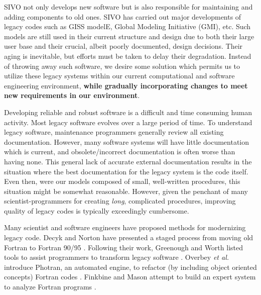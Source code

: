 \documentclass[11pt]{article}
\begin{document}
\noindent
SIVO not only develops new software but is also responsible for
maintaining and adding components to old ones. SIVO has carried out
major developments of legacy codes such as GISS
modelE\cite{Schmidt-eal06}, Global Modeling Initiative (GMI), etc.
Such models are still used in their current structure and design due
to both their large user base and their crucial, albeit poorly
documented, design decisions.  Their aging is inevitable, but efforts
must be taken to delay their degradation\cite{Parnas94}.  Instead of
throwing away such software, we desire some solution which permits us
to utilize these legacy systems within our current computational
and software engineering environment, {\bf while gradually incorporating
changes to meet new requirements in our environment}.

Developing reliable and robust software is a difficult and time
consuming human activity. Most legacy software evolves over a large
period of time.  To understand legacy software, maintenance
programmers generally review all existing documentation. However, many
software systems will have little documentation which is current, and
obsolete/incorrect documentation is often worse than having none. This
general lack of accurate external documentation results in the
situation where the best documentation for the legacy system is the
code itself\cite{Biggerstaff90}.  Even then, were our models composed
of small, well-written procedures, this situation might be somewhat
reasonable.  However, given the penchant of many scientist-programmers
for creating \emph{long}, complicated procedures, improving quality of
legacy codes is typically exceedingly cumbersome.

Many scientist and software engineers have proposed methods for modernizing
legacy code. Decyk and Norton have presented a staged process from moving
old Fortran to Fortran 90/95 \cite{Decyk-etal98, Decyk-etal, Norton-Decyk01}.
Following their work, Greenough and Worth listed tools to assist programmers
to transform legacy software \cite{Greenough-Worth06}.
Overbey {\em et al.} introduce Photran, an automated engine, to refactor
(by including object oriented concepts) Fortran codes \cite{Overbey-etal05}. 
Finkbine and Mason attempt to build an expert system to analyze Fortran programs
\cite{Finkbine-Mason97}.
\end{document}
